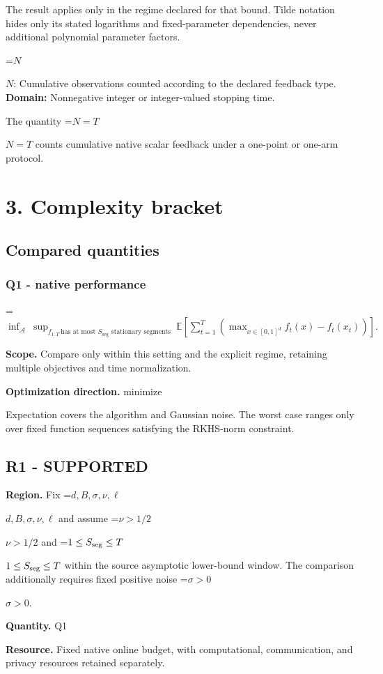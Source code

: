 \documentclass[10pt,a4paper]{article}
\newcommand{\AtlasMath}[1]{\par\begingroup\centering\setbox0=\hbox{$\displaystyle #1$}\ifdim\wd0>1.4\linewidth\typeout{ATLAS WIDE FORMULA: \the\wd0}\fi\ifdim\wd0>\linewidth\resizebox{\linewidth}{!}{\box0}\else\box0\fi\par\endgroup}
\newcommand{\AtlasInlineMath}[1]{\begingroup\setbox0=\hbox{$#1$}\ifdim\wd0>.4\linewidth\endgroup\AtlasMath{#1}\else\endgroup$#1$\fi}
\begin{document}
The result applies only in the regime declared for that bound. Tilde notation hides only its stated logarithms and fixed-parameter dependencies, never additional polynomial parameter factors.

\AtlasInlineMath{N}: Cumulative observations counted according to the declared feedback type. \textbf{Domain:} Nonnegative integer or integer-valued stopping time.

The quantity \AtlasInlineMath{N=T} counts cumulative native scalar feedback under a one-point or one-arm protocol.

\section{3. Complexity bracket}
\subsection{Compared quantities}
\subsubsection{Q1 - native performance}
\AtlasMath{\inf_{\mathcal A}\ \sup_{f_{1:T}\ \text{has at most }S_{\mathrm{seg}}\text{ stationary segments}}\ \mathbb E\!\left[\sum_{t=1}^{T}\left(\max_{x\in[0,1]^d}f_t(x)-f_t(x_t)\right)\right].}
\textbf{Scope.} Compare only within this setting and the explicit regime, retaining multiple objectives and time normalization.

\textbf{Optimization direction.} minimize

Expectation covers the algorithm and Gaussian noise. The worst case ranges only over fixed function sequences satisfying the RKHS-norm constraint.

\subsection{R1 - SUPPORTED}
\textbf{Region.} Fix \AtlasInlineMath{d,B,\sigma,\nu,\ell} and assume \AtlasInlineMath{\nu>1/2} and \AtlasInlineMath{1\le S_{\rm seg}\le T} within the source asymptotic lower-bound window. The comparison additionally requires fixed positive noise \AtlasInlineMath{\sigma>0}.

\textbf{Quantity.} Q1

\textbf{Resource.} Fixed native online budget, with computational, communication, and privacy resources retained separately.
\end{document}

